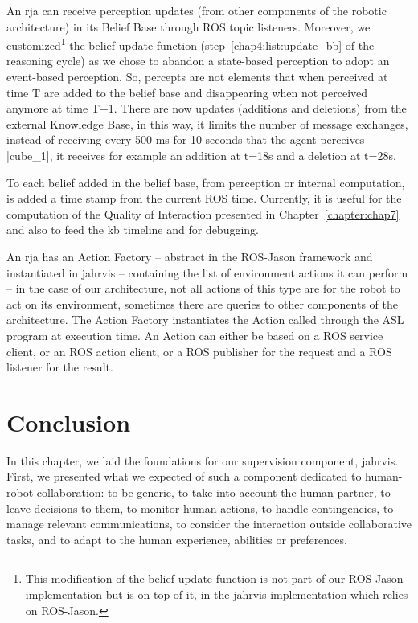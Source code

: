 \documentclass[a4paper,11pt,twoside]{StyleThese}
\begin{document}
An \acrshort{rja} can receive perception updates (from other components of the robotic architecture) in its Belief Base through ROS topic listeners. Moreover, we customized\footnote{This modification of the belief update function is not part of our ROS-Jason implementation but is on top of it, in the \acrshort{jahrvis} implementation which relies on ROS-Jason.} the belief update function (step~\ref{chap4:list:update_bb} of the reasoning cycle) as we chose to abandon a state-based perception to adopt an event-based perception. So, percepts are not elements that when perceived at time T are added to the belief base and disappearing when not perceived anymore at time T+1. There are now updates (additions and deletions) from the external Knowledge Base, in this way, it limits the number of message exchanges, \ie instead of receiving every 500 ms for 10 seconds that the agent perceives |cube_1|, it receives for example an addition at t=18s and a deletion at t=28s. 

To each belief added in the belief base, from perception or internal computation, is added a time stamp from the current ROS time. Currently, it is useful for the computation of the Quality of Interaction presented in Chapter~\ref{chapter:chap7} and also to feed the \acrshort{kb} timeline and for debugging.

An \acrshort{rja} has an Action Factory -- abstract in the ROS-Jason framework and instantiated in \acrshort{jahrvis} -- containing the list of environment actions it can perform -- in the case of our architecture, not all actions of this type are for the robot to act on its environment, sometimes there are queries to other components of the architecture. The Action Factory instantiates the Action called through the ASL program at execution time. An Action can either be based on a ROS service client, or an ROS action client, or a ROS publisher for the request and a ROS listener for the result. 

\section{Conclusion}

In this chapter, we laid the foundations for our supervision component, \acrshort{jahrvis}. First, we presented what we expected of such a component dedicated to human-robot collaboration: to be generic, to take into account the human partner, to leave decisions to them, to monitor human actions, to handle contingencies, to manage relevant communications, to consider the interaction outside collaborative tasks, and to adapt to the human experience, abilities or preferences.
\end{document}
